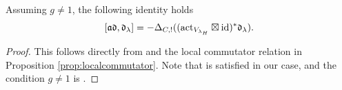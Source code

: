 \documentclass[reqno]{amsart}
\numberwithin{equation}{section}
\numberwithin{equation}{section}
\begin{document}
\begin{prop}\label{prop:globalcommutator}
    Assuming $g\neq 1$, the following identity holds \[[\mathfrak{a}\mathfrak{d},\mathfrak{d}_{\lambda}]=-\Delta_{C,!}((\mathrm{act}_{V_{\lambda_H}}\boxtimes \mathrm{id})^*\mathfrak{d}_{\lambda}).\]
\end{prop}

\begin{proof}
    This follows directly from \cite[Theorem\,4.47]{liu2025higherperiodintegralsderivatives} and the local commutator relation in Proposition \ref{prop:localcommutator}. Note that \cite[Assumption\,4.46(1)]{liu2025higherperiodintegralsderivatives} is satisfied in our case, and the condition $g\neq 1$ is \cite[Assumption\,4.46(2)]{liu2025higherperiodintegralsderivatives}.
\end{proof}

\end{document}
